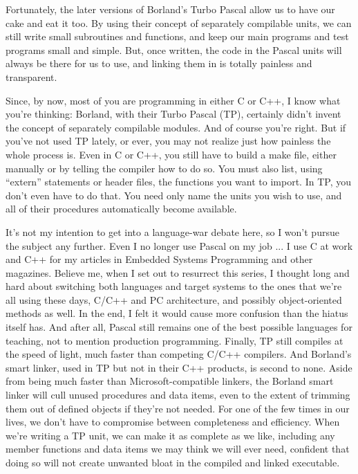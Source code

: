 Fortunately, the later versions of Borland's Turbo Pascal allow us to have our cake and eat it too. By using their concept of separately compilable units, we can still write small subroutines and functions, and keep our main programs and test programs small and simple. But, once written, the code in the Pascal units will always be there for us to use, and linking them in is totally painless and transparent.

Since, by now, most of you are programming in either C or C++, I know what you're thinking:  Borland, with their Turbo Pascal (TP), certainly didn't invent the concept of separately compilable modules. And of course you're right. But if you've not used TP lately, or ever, you may not realize just how painless the whole process is. Even in C or C++, you still have to build a make file, either manually or by telling the compiler how to do so. You must also list, using ``extern'' statements or header files, the functions you want to import. In TP, you don't even have to do that. You need only name the units you wish to use, and all of their procedures automatically become available.


It's not my intention to get into a language-war debate here, so I won't pursue the subject any further. Even I no longer use Pascal on my job ... I use C at work and C++ for my articles in Embedded Systems Programming and other magazines. Believe me, when I set out to resurrect this series, I thought long and hard about switching both languages and target systems to the ones that we're all using these days, C/C++ and PC architecture, and possibly object-oriented methods as well. In the end, I felt it would cause more confusion than the hiatus itself has. And after all, Pascal still remains one of the best possible languages for teaching, not to mention production programming. Finally, TP still compiles at the speed of light, much faster than competing C/C++ compilers. And Borland's smart linker, used in TP but not in their C++ products, is second to none. Aside from being much faster than Microsoft-compatible linkers, the Borland smart linker will cull unused procedures and data items, even to the extent of trimming them out of defined objects if they're not needed. For one of the few times in our lives, we don't have to compromise between completeness and efficiency. When we're writing a TP unit, we can make it as complete as we like, including any member functions and data items we may think we will ever need, confident that doing so will not create unwanted bloat in the compiled and linked executable.

